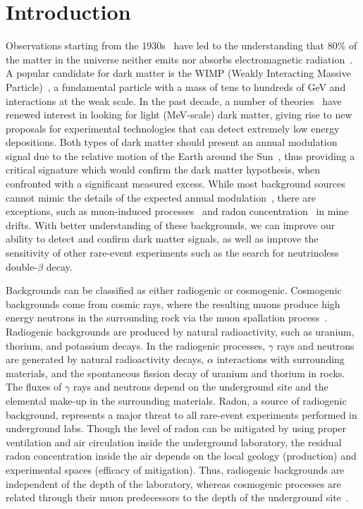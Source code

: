 \documentclass[aps,prc,showpacs,twocolumn,superscriptaddress]{revtex4-1}
\begin{document}
\section{Introduction}
Observations starting from the 1930s~\cite{fzw} have led to the understanding that 80\% of the matter in the universe neither emits nor absorbs electromagnetic radiation~\cite{ghi, rjg}. A popular candidate for dark matter is the WIMP (Weakly Interacting Massive Particle)~\cite{jlf, mwg}, a fundamental particle with a mass of tens to hundreds of GeV and interactions at the weak scale.  In the past decade, a number of theories~\cite{res, cmh} have renewed interest in looking for light (MeV-scale) dark matter, giving rise to new proposals for experimental technologies that can detect extremely low energy depositions.   Both types of dark matter should present an annual modulation signal due to the relative motion of the Earth around the Sun~\cite{freese}, thus providing a critical signature which would confirm the dark matter hypothesis, when confronted with a significant measured excess.   While most background sources cannot mimic the details of the expected annual modulation~\cite{freese, dama, cogent2}, there are exceptions, such as muon-induced processes~\cite{jch} and radon concentration~\cite{ruddick, minos} in mine drifts.   With better understanding of these backgrounds, we can improve our  ability to detect and confirm dark matter signals, as well as improve the sensitivity of other rare-event experiments such as the search for neutrinoless double-$\beta$ decay. 

Backgrounds can be classified as either radiogenic or cosmogenic. Cosmogenic backgrounds come from cosmic rays, where the resulting muons produce high energy neutrons in the surrounding rock via the muon spallation process~\cite{muon}.  Radiogenic backgrounds are produced by natural radioactivity, such as uranium, thorium, and potassium decays.  In the radiogenic processes, $\gamma$ rays and neutrons are  generated by natural radioactivity decays, $\alpha$ interactions with surrounding materials, and the spontaneous fission decay of uranium and thorium in rocks. The fluxes of $\gamma$ rays and neutrons depend on the underground site and the elemental make-up in the surrounding materials.  Radon, a source of radiogenic background, represents a major threat to all rare-event experiments performed in underground labs. Though the level of radon can be mitigated by using proper ventilation and air circulation inside the underground laboratory, the residual radon concentration inside the air depends on the local geology (production) and experimental spaces (efficacy of mitigation).  Thus, radiogenic backgrounds are independent of the depth of the laboratory, whereas cosmogenic processes are related through their muon predecessors to the depth of the underground site~\cite{muon intensity}.
\end{document}
